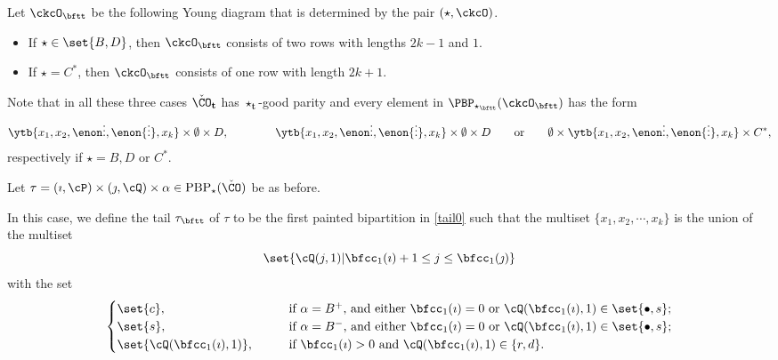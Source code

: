 \documentclass[ssunip]{subfiles}
\begin{document}
Let $\ckcO_{\bftt}$ be the following Young diagram that is
determined by the pair $(\star, \ckcO)$.
\begin{itemize}
    \item If $\star \in \set{B,D}$,
then $\ckcO_{\bftt}$  consists of two rows with lengths $2k-1$ and $1$.
\item
If $\star =C^*$, then $\ckcO_{\bftt}$ consists of one row
with length  $2k+1$.
\end{itemize}
Note that  in all these three cases
 $\check \CO_{\mathbf t}$ has $\star_{\mathbf t}$-good parity and every element in $\PBP_{\star_\bftt}(\ckcO_\bftt)$ has the form
 \begin{equation}
 \label{tail0}
  \ytb{{x_1} , {x_2} , {\enon\vdots},{\enon{\vdots}},{x_k}  } \times \emptyset \times
  D,\qquad \qquad  \ytb{{x_1} , {x_2} , {\enon\vdots},{\enon{\vdots}},{x_k}  } \times \emptyset \times
  D\qquad\textrm{or}\qquad \emptyset \times  \ytb{{x_1} , {x_2} , {\enon\vdots},{\enon{\vdots}},{x_k}  } \times
 C^*,
\end{equation}
respectively if $\star=B, D$ or $C^*$. %

Let
$
\tau=(\imath,\cP)\times(\jmath,\cQ)\times \alpha \in  \mathrm{PBP}_\star(\check \CO)
$ be as before.


In this case, we define the tail $\tau_\bftt$ of $\tau$ to be the first painted bipartition in \eqref{tail0} such that the multiset $\{x_1, x_2, \cdots, x_k\}$ is the
union of the multiset
\[
  \set{\cQ(j,1)| \bfcc_{1}(\imath)+1 \leq j \leq  \bfcc_{1}(\jmath) }
\]
with the set
\[
  \begin{cases}
 \set{c}, &
 \qquad
  \text{if $\alpha = B^+$, and either $\bfcc_{1}(\imath)=0$ or $\cQ(\bfcc_{1}(\imath),1)\in \set{\bullet,s}$};  \\
 \set{s},&
  \qquad \text{if $\alpha = B^-$, and either $\bfcc_{1}(\imath)=0$ or $\cQ(\bfcc_{1}(\imath),1)\in \set{\bullet,s}$}; \\
\set{\cQ(\bfcc_{1}(\imath),1)},&
\qquad  \text{if $\bfcc_{1}(\imath)>0$ and $\cQ(\bfcc_{1}(\imath),1)\in \{r,d\}$.}
\end{cases}
\]
\end{document}
